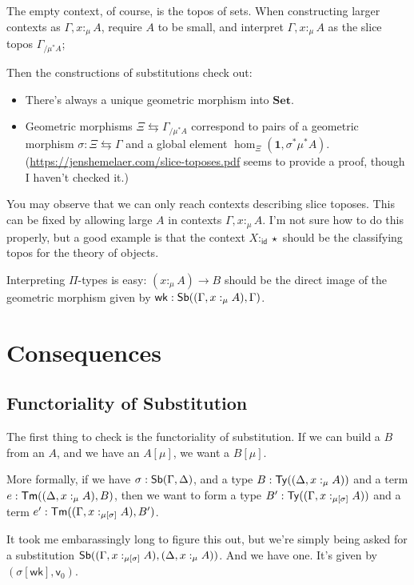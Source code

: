 \documentclass{article}
\begin{document}
The empty context, of course, is the topos of sets.
When constructing larger contexts as \(\Gamma, x :_\mu A\), require \(A\) to be small,
and interpret \(\Gamma, x :_\mu A\) as the slice topos \(\Gamma_{/\mu^*A}\);

Then the constructions of substitutions check out:
\begin{itemize}
    \item There's always a unique geometric morphism into \(\mathbf{Set}\).
    \item Geometric morphisms \(\Xi \leftrightarrows \Gamma_{/\mu^*A}\) correspond to pairs of a geometric morphism \(\sigma : \Xi \leftrightarrows \Gamma\) and a global element \(\hom_\Xi(\mathbf{1},\sigma^*\mu^*A)\).
    (\url{https://jenshemelaer.com/slice-toposes.pdf} seems to provide a proof, though I haven't checked it.)
\end{itemize}

You may observe that we can only reach contexts describing slice toposes.
This can be fixed by allowing large \(A\) in contexts \(\Gamma, x :_\mu A\).
I'm not sure how to do this properly, but a good example is that
the context \(X :_{\mathsf{id}} \star\) should be the classifying topos for the theory of objects.

Interpreting \(\Pi\)-types is easy: \((x :_\mu A) \to B\) should be the direct image of the geometric morphism
given by \(\mathsf{wk} : \mathsf{Sb}((\Gamma, x :_\mu A),\Gamma)\).


\section{Consequences}

\subsection{Functoriality of Substitution}

The first thing to check is the functoriality of substitution.
If we can build a \(B\) from an \(A\), and we have an \(A[\mu]\), we want a \(B[\mu]\).

More formally, if we have \(\sigma : \mathsf{Sb}(\Gamma,\Delta)\),
and a type \(B : \mathsf{Ty}((\Delta, x :_\mu A))\) and a term \(e : \mathsf{Tm}((\Delta, x :_\mu A), B)\),
then we want to form a type \(B' : \mathsf{Ty}((\Gamma, x :_{\mu[\sigma]} A))\)
and a term \(e' : \mathsf{Tm}((\Gamma, x :_{\mu[\sigma]} A), B')\).

It took me embarassingly long to figure this out, but we're simply being asked for a substitution
\(\mathsf{Sb}((\Gamma, x :_{\mu[\sigma]} A), (\Delta, x :_\mu A))\).
And we have one. It's given by \((\sigma[\mathsf{wk}],\mathsf{v}_0)\).
\end{document}
